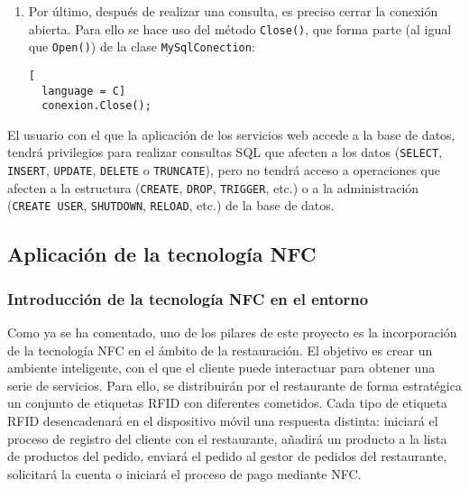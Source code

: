 \begin{enumerate}
\begin{itemize}
\item Por otro lado, si la consulta no va a devolver ningún resultado, es
decir, si la consulta es del tipo: \texttt{INSERT}, \texttt{UPDATE},
\texttt{DELETE}, \texttt{TRUNCATE}, etc.; se utilizará el método
\texttt{ExecuteNonQuery()}:

\begin{lstlisting}[
  language = C]
  comando.ExecuteNonQuery();
\end{lstlisting}

La consulta tendrá efecto en la base de datos pero no devolverá ningún
resultado.
\end{itemize}

\item Por último, después de realizar una consulta, es preciso cerrar la
conexión abierta. Para ello se hace uso del método \texttt{Close()}, que forma
parte (al igual que \texttt{Open()}) de la clase \texttt{MySqlConection}:

\begin{lstlisting}[
  language = C]
  conexion.Close();
\end{lstlisting}
\end{enumerate}

El usuario con el que la aplicación de los servicios web accede a la base
de datos, tendrá privilegios para realizar consultas \acs{SQL} que afecten
a los datos (\texttt{SELECT}, \texttt{INSERT}, \texttt{UPDATE},
\texttt{DELETE} o \texttt{TRUNCATE}), pero no tendrá acceso a operaciones
que afecten a la estructura  (\texttt{CREATE}, \texttt{DROP}, \texttt{TRIGGER},
etc.) o a la administración (\texttt{CREATE USER}, \texttt{SHUTDOWN},
\texttt{RELOAD}, etc.) de la base de datos.

  \subsection{Aplicación de la tecnología \acs{NFC}}
  \label{subsec:nfcApp}
    \subsubsection{Introducción de la tecnología \acs{NFC} en el entorno}
Como ya se ha comentado, uno de los pilares de este proyecto es la
incorporación de la tecnología \acs{NFC} en el ámbito de la restauración.
El objetivo es crear un ambiente inteligente, con el que el cliente puede 
interactuar para obtener una serie de servicios. Para ello, se distribuirán 
por el restaurante de forma estratégica un conjunto de etiquetas \acs{RFID} 
con diferentes cometidos. Cada tipo de etiqueta \acs{RFID} desencadenará en el 
dispositivo móvil una respuesta distinta: iniciará el proceso de registro del 
cliente con el restaurante, añadirá un producto a la lista de productos del 
pedido, enviará el pedido al gestor de pedidos del restaurante, solicitará la 
cuenta o iniciará el proceso de pago mediante \acs{NFC}.

